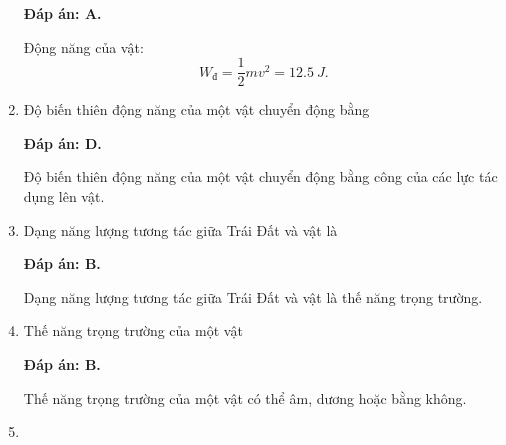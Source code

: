 \begin{enumerate}[label=\bfseries Câu \arabic*:]
	\hideall
	{	
		\textbf{Đáp án: A.}
		
		Động năng của vật:
		$$W_\text{đ} = \dfrac{1}{2} mv^2  =\SI{12.5}{J}.$$
	}
	\item {}
	
	
	{
		Độ biến thiên động năng của một vật chuyển động bằng
	}
	
	\hideall
	{	
		\textbf{Đáp án: D.}
		
		Độ biến thiên động năng của một vật chuyển động bằng công của các lực tác dụng lên vật.
	}
		\item {}
	
	
	{
		Dạng năng lượng tương tác giữa Trái Đất và vật là
	}
	
	\hideall
	{	
		\textbf{Đáp án: B.}
		
		Dạng năng lượng tương tác giữa Trái Đất và vật là thế năng trọng trường.
	}
	\item {}
	
	
	{
		Thế năng trọng trường của một vật
	}
	
	\hideall
	{	
		\textbf{Đáp án: B.}
		
		Thế năng trọng trường của một vật có thể âm, dương hoặc bằng không.
	}
	\item {}
	

\end{enumerate}
